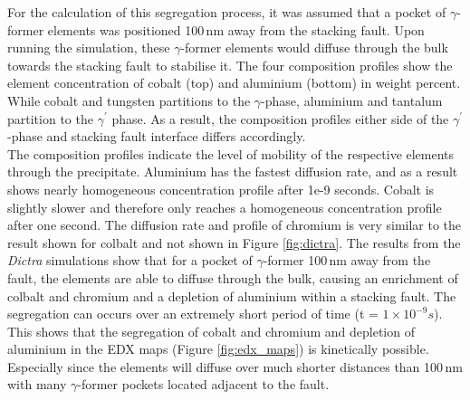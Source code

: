 \documentclass[a4paper,12pt,times,numbered,print,index]{Classes/PhDThesisPSnPDF}
\begin{document}
For the calculation of this segregation process, it was assumed that a pocket of $\gamma$-former elements was positioned 100\,nm away from the stacking fault. Upon running the simulation, these $\gamma$-former elements would diffuse through the bulk towards the stacking fault to stabilise it.
The four composition profiles show the element concentration of cobalt (top) and aluminium (bottom) in weight percent. While cobalt and tungsten partitions to the $\gamma$-phase, aluminium and tantalum  partition to the $\gamma^\prime$ phase.\cite{} As a result, the composition profiles either side of the $\gamma^\prime$-phase and stacking fault interface differs accordingly.\\
The composition profiles indicate the level of mobility of the respective elements through the precipitate. Aluminium has the fastest diffusion rate, and as a result shows nearly homogeneous concentration profile after 1e-9 seconds. Cobalt is slightly slower and therefore only reaches a homogeneous concentration profile after one second. The diffusion rate and profile of chromium is very similar to the result shown for colbalt and not shown in Figure \ref{fig:dictra}.
The results from the \textit{Dictra} simulations show that for a pocket of $\gamma$-former 100\,nm away from the fault, the elements are able to diffuse through the bulk, causing an enrichment of colbalt and chromium and a depletion of aluminium within a stacking fault. The segregation can occurs over an extremely short period of time (t = $1\times 10^{-9}s$). This shows that the segregation of cobalt and chromium and depletion of aluminium in the EDX maps (Figure \ref{fig:edx_maps}) is kinetically possible. Especially since the elements will diffuse over much shorter distances than 100\,nm with many $\gamma$-former pockets located adjacent to the fault.\\
\end{document}
